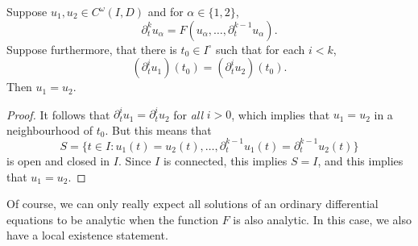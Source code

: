 \begin{lemma}
    Suppose $u_1,u_2 \in C^\omega(I,D)$ and for $\alpha \in \{ 1, 2 \}$,
    \[ \partial_t^k u_\alpha = F(u_\alpha, \dots, \partial_t^{k-1} u_\alpha). \]
    Suppose furthermore, that there is $t_0 \in I^\circ$ such that for each $i < k$,
    \[ (\partial_t^i u_1)(t_0) = (\partial_t^i u_2)(t_0). \]
    Then $u_1 = u_2$.
\end{lemma}
\begin{proof}
    It follows that $\partial_t^i u_1 = \partial_t^i u_2$ for \emph{all} $i > 0$, which implies that $u_1 = u_2$ in a neighbourhood of $t_0$. But this means that
    \[ S = \{ t \in I: u_1(t) = u_2(t), \dots, \partial_t^{k-1} u_1(t) = \partial_t^{k-1} u_2(t) \} \]
    is open and closed in $I$. Since $I$ is connected, this implies $S = I$, and this implies that $u_1 = u_2$.
\end{proof}

Of course, we can only really expect all solutions of an ordinary differential equations to be analytic when the function $F$ is also analytic. In this case, we also have a local existence statement.

